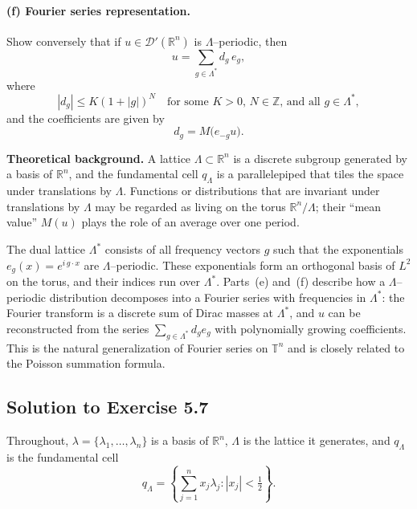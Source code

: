 \documentclass[12pt,a4paper]{article}
\theoremstyle{plain}
\theoremstyle{definition}
\theoremstyle{remark}
\theoremstyle{remark}
\begin{document}
	\paragraph{(f) Fourier series representation.}
	Show conversely that if $u\in\mathcal{D}'(\mathbb{R}^n)$ is
	$\Lambda$–periodic, then
	\[
	u = \sum_{g\in\Lambda^*} d_g\,e_g,
	\]
	where
	\[
	|d_g| \le K(1+|g|)^N
	\quad\text{for some $K>0$, $N\in\mathbb{Z}$, and all }g\in\Lambda^*,
	\]
	and the coefficients are given by
	\[
	d_g = M\bigl(e_{-g}u\bigr).
	\]
	
	\bigskip
	\noindent\textbf{Theoretical background.}
	A lattice $\Lambda\subset\mathbb{R}^n$ is a discrete subgroup generated
	by a basis of $\mathbb{R}^n$, and the fundamental cell $q_\Lambda$ is a
	parallelepiped that tiles the space under translations by $\Lambda$.
	Functions or distributions that are invariant under translations by
	$\Lambda$ may be regarded as living on the torus
	$\mathbb{R}^n/\Lambda$; their ``mean value'' $M(u)$ plays the role of an
	average over one period.
	
	The dual lattice $\Lambda^*$ consists of all frequency vectors $g$ such
	that the exponentials $e_g(x)=e^{i\,g\cdot x}$ are $\Lambda$–periodic.
	These exponentials form an orthogonal basis of $L^2$ on the torus, and
	their indices run over $\Lambda^*$.  Parts~(e) and~(f) describe how a
	$\Lambda$–periodic distribution decomposes into a Fourier series with
	frequencies in $\Lambda^*$: the Fourier transform is a discrete sum of
	Dirac masses at $\Lambda^*$, and $u$ can be reconstructed from the
	series $\sum_{g\in\Lambda^*} d_g e_g$ with polynomially growing
	coefficients.  This is the natural generalization of Fourier series on
	$\mathbb{T}^n$ and is closely related to the Poisson summation formula.
	
	
	
	\subsection*{Solution to Exercise 5.7}
	
	Throughout, $\lambda=\{\lambda_1,\dots,\lambda_n\}$ is a basis of
	$\mathbb{R}^n$, $\Lambda$ is the lattice it generates, and
	$q_\Lambda$ is the fundamental cell
	\[
	q_\Lambda = \left\{\sum_{j=1}^n x_j\lambda_j : |x_j|<\tfrac12\right\}.
	\]
	
	
\end{document}
